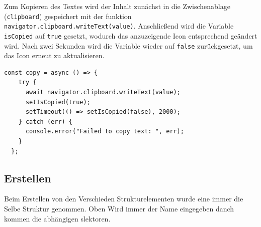 \begin{inhalt}
\begin{enumerate}[label=\textbf{\arabic*.}]
Zum Kopieren des Textes wird der Inhalt zunächst in die Zwischenablage (\texttt{clipboard}) gespeichert mit der funktion \texttt{navigator.clipboard.writeText(value)}. 
Anschließend wird die Variable \texttt{isCopied} auf \texttt{true} gesetzt, wodurch das anzuzeigende Icon entsprechend geändert wird.  
Nach zwei Sekunden wird die Variable wieder auf \texttt{false} zurückgesetzt, um das Icon erneut zu aktualisieren.


\begin{lstlisting}[language=mytsx]
const copy = async () => {
    try {
      await navigator.clipboard.writeText(value);
      setIsCopied(true);
      setTimeout(() => setIsCopied(false), 2000);
    } catch (err) {
      console.error("Failed to copy text: ", err);
    }
  };
\end{lstlisting}

\clearpage

\subsection{Erstellen}

Beim Erstellen von den Verschieden Strukturelementen wurde eine immer die Selbe Struktur genommen. Oben Wird immer der Name eingegeben danch kommen die abhängigen slektoren.


\end{enumerate}
\end{inhalt}
